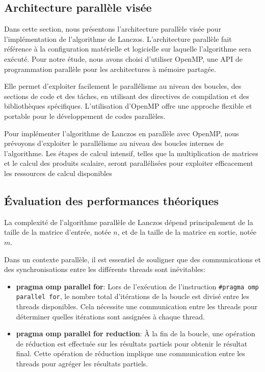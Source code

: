 \documentclass[11pt,french]{article}
\begin{document}
    \subsection{Architecture parallèle visée}
    Dans cette section, nous présentons l'architecture parallèle visée pour l'implémentation de l'algorithme de Lanczos. L'architecture parallèle fait référence à la configuration matérielle et logicielle sur laquelle l'algorithme sera exécuté. Pour notre étude, nous avons choisi d'utiliser OpenMP, une API de programmation parallèle pour les architectures à mémoire partagée.
    
    Elle permet d'exploiter facilement le parallélisme au niveau des boucles, des sections de code et des tâches, en utilisant des directives de compilation et des bibliothèques spécifiques. L'utilisation d'OpenMP offre une approche flexible et portable pour le développement de codes parallèles.
    
    Pour implémenter l'algorithme de Lanczos en parallèle avec OpenMP, nous prévoyons d'exploiter le parallélisme au niveau des boucles internes de l'algorithme. Les étapes de calcul intensif, telles que la multiplication de matrices et le calcul des produits scalaire, seront parallélisées pour exploiter efficacement les ressources de calcul disponibles
    
	\subsection{Évaluation des performances théoriques}
	La complexité de l'algorithme parallèle de Lanczos dépend principalement de la taille de la matrice d'entrée, notée $n$, et de la taille de la matrice en sortie, notée $m$.

    Dans un contexte parallèle, il est essentiel de souligner que des communications et des synchronisations entre les différents threads sont inévitables:
    \begin{itemize}
    \item \textbf{pragma omp parallel for}:  Lors de l'exécution de l'instruction \texttt{\#pragma omp parallel for}, le nombre total d'itérations de la boucle est divisé entre les threads disponibles. Cela nécessite une communication entre les threads pour déterminer quelles itérations sont assignées à chaque thread.
    
    \item \textbf{pragma omp parallel for reduction}:  À la fin de la boucle, une opération de réduction est effectuée sur les résultats partiels pour obtenir le résultat final. Cette opération de réduction implique une communication entre les threads pour agréger les résultats partiels.
	\end{itemize}
\end{document}
